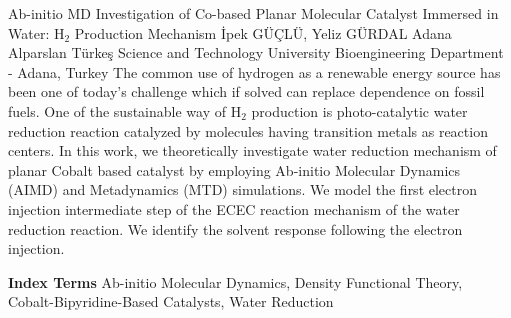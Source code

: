 
    \begin{abstract_online}{Ab-initio MD Investigation of Co-based Planar Molecular Catalyst Immersed in Water: $\mathrm{H}_{2}$ Production Mechanism}{%
        İpek GÜÇLÜ, Yeliz GÜRDAL}{%
        }{%
        Adana Alparslan Türkeş Science and Technology University Bioengineering Department - Adana, Turkey}
    The common use of hydrogen as a renewable energy source has been one of today's challenge which if solved can replace dependence on fossil fuels. One of the sustainable way of $\mathrm{H}_{2}$ production is photo-catalytic water reduction reaction catalyzed by molecules having transition metals as reaction centers. In this work, we theoretically investigate water reduction mechanism of planar Cobalt based catalyst by employing Ab-initio Molecular Dynamics (AIMD) and Metadynamics (MTD) simulations. We model the first electron injection intermediate step of the ECEC reaction mechanism of the water reduction reaction. We identify the solvent response following the electron injection. 
    
            \textbf{Index Terms} \newline{}Ab-initio Molecular Dynamics, Density Functional Theory, Cobalt-Bipyridine-Based Catalysts, Water Reduction
    \end{abstract_online}
    